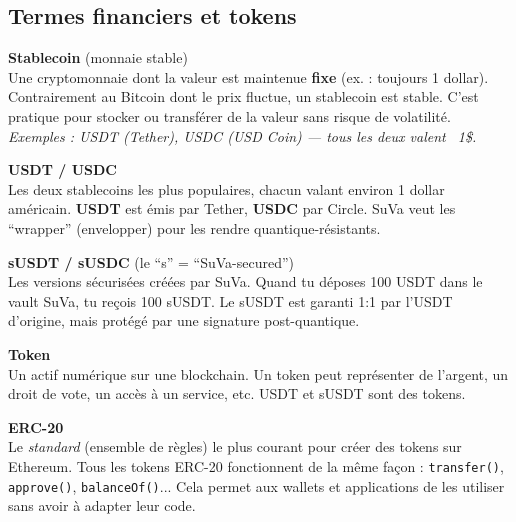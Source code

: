 \documentclass[12pt, a4paper]{article}
\begin{document}
\vspace{0.4cm}

\subsection{Termes financiers et tokens}

\begin{tcolorbox}[colback=gray!4, colframe=gray!50, breakable]

\textbf{Stablecoin} (monnaie stable)\\
\hspace*{1em} Une cryptomonnaie dont la valeur est maintenue \textbf{fixe} (ex. : toujours 1 dollar).
Contrairement au Bitcoin dont le prix fluctue, un stablecoin est stable. C'est pratique pour
stocker ou transférer de la valeur sans risque de volatilité.\\
\hspace*{1em} \textit{Exemples : USDT (Tether), USDC (USD Coin) --- tous les deux valent ~1\$.}

\vspace{0.4cm}

\textbf{USDT / USDC}\\
\hspace*{1em} Les deux stablecoins les plus populaires, chacun valant environ 1 dollar américain.
\textbf{USDT} est émis par Tether, \textbf{USDC} par Circle. SuVa veut les ``wrapper'' (envelopper)
pour les rendre quantique-résistants.

\vspace{0.4cm}

\textbf{sUSDT / sUSDC} (le ``s'' = ``SuVa-secured'')\\
\hspace*{1em} Les versions sécurisées créées par SuVa. Quand tu déposes 100 USDT dans le vault SuVa,
tu reçois 100 sUSDT. Le sUSDT est garanti 1:1 par l'USDT d'origine, mais protégé par une
signature post-quantique.

\vspace{0.4cm}

\textbf{Token}\\
\hspace*{1em} Un actif numérique sur une blockchain. Un token peut représenter de l'argent,
un droit de vote, un accès à un service, etc. USDT et sUSDT sont des tokens.

\vspace{0.4cm}

\textbf{ERC-20}\\
\hspace*{1em} Le \textit{standard} (ensemble de règles) le plus courant pour créer des tokens sur
Ethereum. Tous les tokens ERC-20 fonctionnent de la même façon :
\texttt{transfer()}, \texttt{approve()}, \texttt{balanceOf()}... Cela permet aux wallets et
applications de les utiliser sans avoir à adapter leur code.

\end{tcolorbox}
\end{document}
